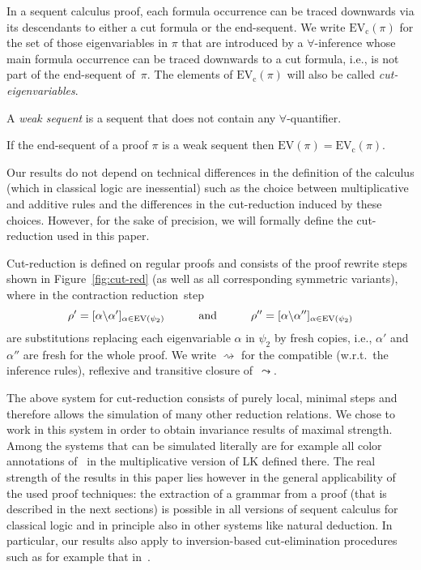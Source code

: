 \documentclass{LMCS}
\theoremstyle{plain}
\theoremstyle{definition}
\newcommand{\sop}{[}
\newcommand{\scl}{]}
\newcommand{\sel}[2]{#1 \backslash #2}
\newcommand{\unsubst}[2]{\sop \sel{#1}{#2} \scl}
\newcommand{\scutred}{\leadsto}
\newcommand{\EV}{\mathrm{EV}}	\newcommand{\EVc}{\mathrm{EV_c}}	\newcommand{\Hseq}{\mathrm{H}}	\newcommand{\Bsub}{\mathrm{B}}	\newcommand{\terms}[1]{\mathrm{tm}(#1)}	\newcommand{\ev}[1]{\mathrm{ev}(#1)}	\newcommand{\cred}{\rightsquigarrow}	\newcommand{\credm}{\stackrel{\mathit{ne}}{\rightsquigarrow}}	\newcommand{\genrel}{\longrightarrow}
\begin{document}
In a sequent calculus proof, each formula occurrence can be traced
downwards via its descendants to either a cut formula or the
end-sequent. We write $\EVc(\pi)$ for the set of those eigenvariables
in $\pi$ that are introduced by a $\forall$-inference whose main
formula occurrence can be traced downwards to a cut formula, i.e., is
not part of the end-sequent of~$\pi$. The elements of $\EVc(\pi)$ will
also be called \emph{cut-eigenvariables}.

\begin{defi}
  A \emph{weak sequent} is a sequent that does not contain any
  $\forall$-quantifier.
\end{defi}

\begin{fact}
  If the end-sequent of a proof $\pi$ is a weak sequent then
  $\EV(\pi)=\EVc(\pi)$.
\end{fact} 

\begin{rem}
  Our results do not depend on technical differences in the definition
  of the calculus (which in classical logic are inessential) such as
  the choice between multiplicative and additive rules and the
  differences in the cut-reduction induced by these choices. However,
  for the sake of precision, we will formally define the cut-reduction
  used in this paper.
\end{rem}

\begin{defi}
  Cut-reduction is defined on regular proofs and consists of the proof
  rewrite steps shown in Figure~\ref{fig:cut-red} (as well as all
  corresponding symmetric variants), where in the contraction
  reduction~step
  $$\rho'=\unsubst{\alpha}{\alpha'}_{\alpha\in \EV(\psi_2)}
  \qqquand
  \rho''=\unsubst{\alpha}{\alpha''}_{\alpha\in \EV(\psi_2)}$$ are
  substitutions replacing each eigenvariable $\alpha$
  in $\psi_2$ by fresh copies, i.e., $\alpha'$ and $\alpha''$ are
  fresh for the whole proof.
  We write $\cred$
  for the compatible (w.r.t.\ the inference rules), 
  reflexive and
  transitive closure of~$\scutred$.
\end{defi}

The above system for cut-reduction consists of purely local, minimal
steps and therefore allows the simulation of many other reduction relations.
We chose to work in this system in order to obtain invariance results of maximal strength.
Among the systems that can be simulated literally are for example all color annotations
of~\cite{Danos97New} in the multiplicative version of LK defined there. The real strength
of the results in this paper lies however in the general applicability of the
used proof techniques: the extraction of a grammar from a proof (that is described
in the next sections) is possible in all versions
of sequent calculus for classical logic and in principle also in other
systems like natural deduction. In particular, our results also apply to
inversion-based cut-elimination procedures such as for example that
in~\cite{Schwichtenberg77Proof}.
\end{document}
